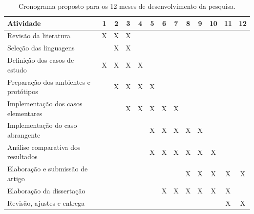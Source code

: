 \documentclass[12pt,a4paper]{article}
\begin{document}
\begin{table}[htbp]
\centering
\caption{Cronograma proposto para os 12 meses de desenvolvimento da pesquisa.}
\label{tab:cronograma}
\footnotesize
\setlength{\tabcolsep}{1.8pt}
\renewcommand{\arraystretch}{1.15}
\begin{tabular}{|>{\raggedright\arraybackslash}p{6.6cm}|*{12}{c|}}
\hline
Atividade                                     & 1 & 2 & 3 & 4 & 5 & 6 & 7 & 8 & 9 & 10 & 11 & 12 \\ \hline
Revisão da literatura                         & X & X & X &   &   &   &   &   &   &    &    &    \\ \hline
Seleção das linguagens                        &   & X & X &   &   &   &   &   &   &    &    &    \\ \hline
Definição dos casos de estudo                 & X & X & X & X &   &   &   &   &   &    &    &    \\ \hline
Preparação dos ambientes e protótipos         &   & X & X & X & X &   &   &   &   &    &    &    \\ \hline
Implementação dos casos elementares           &   &   & X & X & X & X & X &   &   &    &    &    \\ \hline
Implementação do caso abrangente              &   &   &   &   & X & X & X & X & X &    &    &    \\ \hline
Análise comparativa dos resultados            &   &   &   &   & X & X & X & X & X &  X &    &    \\ \hline
Elaboração e submissão de artigo              &   &   &   &   &   &   &   & X & X &  X &  X &  X \\ \hline
Elaboração da dissertação                     &   &   &   &   &   & X & X & X & X &  X &  X &    \\ \hline
Revisão, ajustes e entrega                    &   &   &   &   &   &   &   &   &   &    &  X &  X \\ \hline
\end{tabular}
\end{table}



\end{document}
